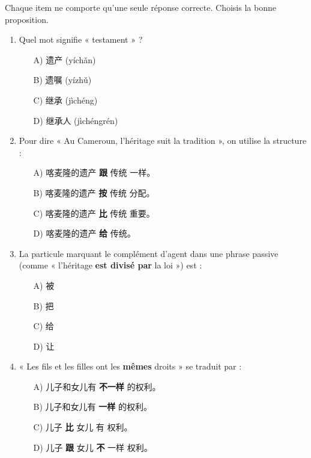 \documentclass[11pt]{article}
\begin{document}
\begin{exercice}
Chaque item ne comporte qu'une seule réponse correcte. Choisis la bonne proposition.
\begin{enumerate}
    \item Quel mot signifie « testament » ?
    \begin{itemize}
        \item[A)] 遗产 (yíchǎn)
        \item[B)] 遗嘱 (yízhǔ)
        \item[C)] 继承 (jìchéng)
        \item[D)] 继承人 (jìchéngrén)
    \end{itemize}
    \item Pour dire « Au Cameroun, l'héritage suit la tradition », on utilise la structure :
    \begin{itemize}
        \item[A)] 喀麦隆的遗产 \textbf{跟} 传统 一样。
        \item[B)] 喀麦隆的遗产 \textbf{按} 传统 分配。
        \item[C)] 喀麦隆的遗产 \textbf{比} 传统 重要。
        \item[D)] 喀麦隆的遗产 \textbf{给} 传统。
    \end{itemize}
    \item La particule marquant le complément d'agent dans une phrase passive (comme « l'héritage \textbf{est divisé par} la loi ») est :
    \begin{itemize}
        \item[A)] 被
        \item[B)] 把
        \item[C)] 给
        \item[D)] 让
    \end{itemize}
    \item « Les fils et les filles ont les \textbf{mêmes} droits » se traduit par :
    \begin{itemize}
        \item[A)] 儿子和女儿有 \textbf{不一样} 的权利。
        \item[B)] 儿子和女儿有 \textbf{一样} 的权利。
        \item[C)] 儿子 \textbf{比} 女儿 有 权利。
        \item[D)] 儿子 \textbf{跟} 女儿 \textbf{不} 一样 权利。
    \end{itemize}
\end{enumerate}
\end{exercice}
\end{document}
